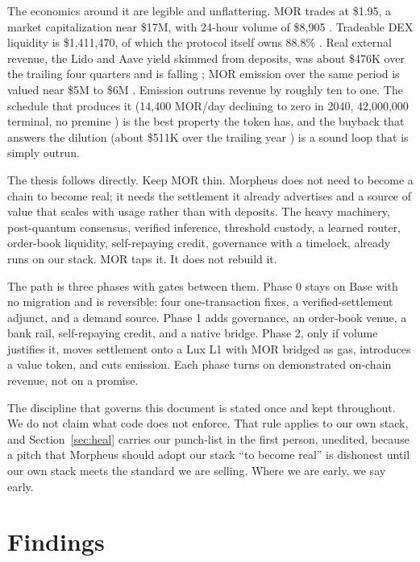 \documentclass[11pt,a4paper]{article}
\newcommand{\prov}[1]{{\color{muted}\footnotesize\sffamily[#1]}}
\begin{document}
The economics around it are legible and unflattering. MOR trades at \$1.95, a market
capitalization near \$17M, with 24-hour volume of \$8,905 \prov{verified}. Tradeable DEX
liquidity is \$1,411,470, of which the protocol itself owns 88.8\% \prov{verified}. Real
external revenue, the Lido and Aave yield skimmed from deposits, was about \$476K over the
trailing four quarters and is falling \prov{verified}; MOR emission over the same period is
valued near \$5M to \$6M \prov{verified}. Emission outruns revenue by roughly ten to one. The
schedule that produces it (14,400 MOR/day declining to zero in 2040, 42,000,000 terminal, no
premine \prov{verified}) is the best property the token has, and the buyback that answers the
dilution (about \$511K over the trailing year \prov{verified}) is a sound loop that is simply
outrun.

The thesis follows directly. Keep MOR thin. Morpheus does not need to become a chain to become
real; it needs the settlement it already advertises and a source of value that scales with
usage rather than with deposits. The heavy machinery, post-quantum consensus, verified
inference, threshold custody, a learned router, order-book liquidity, self-repaying credit,
governance with a timelock, already runs on our stack. MOR taps it. It does not rebuild it.

The path is three phases with gates between them. Phase 0 stays on Base with no migration and
is reversible: four one-transaction fixes, a verified-settlement adjunct, and a demand source.
Phase 1 adds governance, an order-book venue, a bank rail, self-repaying credit, and a native
bridge. Phase 2, only if volume justifies it, moves settlement onto a Lux L1 with MOR bridged
as gas, introduces a value token, and cuts emission. Each phase turns on demonstrated on-chain
revenue, not on a promise.

The discipline that governs this document is stated once and kept throughout. We do not claim
what code does not enforce. That rule applies to our own stack, and Section~\ref{sec:heal}
carries our punch-list in the first person, unedited, because a pitch that Morpheus should
adopt our stack ``to become real'' is dishonest until our own stack meets the standard we are
selling. Where we are early, we say early.

\section{Findings}
\label{sec:findings}
\end{document}
